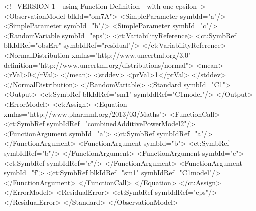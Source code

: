\documentclass[a4paper,10pt]{article}
\begin{document}
\begin{xmlcode}
<!-- VERSION 1 - using Function Definition - with one epsilon-->
<ObservationModel blkId="om7A">
    <SimpleParameter symbId="a"/>
    <SimpleParameter symbId="b"/>
    <SimpleParameter symbId="c"/>
    <RandomVariable symbId="eps">
        <ct:VariabilityReference>
            <ct:SymbRef blkIdRef="obsErr" symbIdRef="residual"/>
        </ct:VariabilityReference>
        <NormalDistribution xmlns="http://www.uncertml.org/3.0" definition="http://www.uncertml.org/distributions/normal">
            <mean>
                <rVal>0</rVal>
            </mean>
            <stddev>
                <prVal>1</prVal>
            </stddev>
        </NormalDistribution>
    </RandomVariable>
    <Standard symbId="C1">
        <Output>
            <ct:SymbRef blkIdRef="sm1" symbIdRef="C1model"/>
        </Output>
        <ErrorModel>
            <ct:Assign>
                <Equation xmlns="http://www.pharmml.org/2013/03/Maths">
                    <FunctionCall>
                        <ct:SymbRef symbIdRef="combinedAdditivePowerModel2"/>
                        <FunctionArgument symbId="a">
                            <ct:SymbRef symbIdRef="a"/>
                        </FunctionArgument>
                        <FunctionArgument symbId="b">
                            <ct:SymbRef symbIdRef="b"/>
                        </FunctionArgument>
                        <FunctionArgument symbId="c">
                            <ct:SymbRef symbIdRef="c"/>
                        </FunctionArgument>
                        <FunctionArgument symbId="f">
                            <ct:SymbRef blkIdRef="sm1" symbIdRef="C1model"/>
                        </FunctionArgument>
                    </FunctionCall>
                </Equation>
            </ct:Assign>
        </ErrorModel>
        <ResidualError>
            <ct:SymbRef symbIdRef="eps"/>
        </ResidualError>
    </Standard>
</ObservationModel> 



\end{xmlcode}
\end{document}
